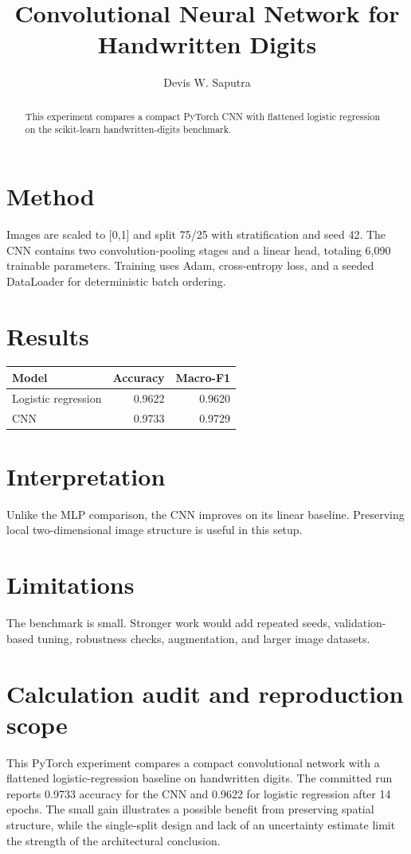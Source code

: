 \documentclass[11pt]{article}
\title{Convolutional Neural Network for Handwritten Digits}
\author{Devis W. Saputra}
\begin{document}
\maketitle

\begin{abstract}
This experiment compares a compact PyTorch CNN with flattened logistic regression on the scikit-learn handwritten-digits benchmark.
\end{abstract}

\section{Method}
Images are scaled to [0,1] and split 75/25 with stratification and seed 42. The CNN contains two convolution-pooling stages and a linear head, totaling 6,090 trainable parameters. Training uses Adam, cross-entropy loss, and a seeded DataLoader for deterministic batch ordering.

\section{Results}
\begin{tabular}{lrr}
\toprule
Model & Accuracy & Macro-F1 \\
\midrule
Logistic regression & 0.9622 & 0.9620 \\
CNN & 0.9733 & 0.9729 \\
\bottomrule
\end{tabular}

\section{Interpretation}
Unlike the MLP comparison, the CNN improves on its linear baseline. Preserving local two-dimensional image structure is useful in this setup.

\section{Limitations}
The benchmark is small. Stronger work would add repeated seeds, validation-based tuning, robustness checks, augmentation, and larger image datasets.

\section{Calculation audit and reproduction scope}
This PyTorch experiment compares a compact convolutional network with a flattened logistic-regression baseline on handwritten digits. The committed run reports 0.9733 accuracy for the CNN and 0.9622 for logistic regression after 14 epochs. The small gain illustrates a possible benefit from preserving spatial structure, while the single-split design and lack of an uncertainty estimate limit the strength of the architectural conclusion.
\end{document}

